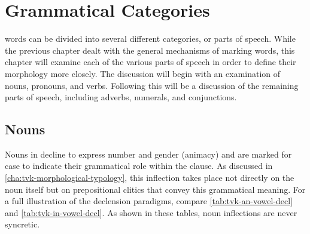 \chapter{Grammatical Categories}
\label{cha:tvk-grammatical-categories}

\langtvk{} words can be divided into several different categories, or parts of speech. While the previous chapter dealt with the general mechanisms of marking words, this chapter will examine each of the various parts of speech in order to define their morphology more closely. The discussion will begin with an examination of nouns, pronouns, and verbs. Following this will be a discussion of the remaining parts of speech, including adverbs, numerals, and conjunctions.

\section{Nouns}
\label{sec:tvk-nouns}

Nouns in \langtvk{} decline to express number and gender (animacy) and are marked for case to indicate their grammatical role within the clause. As discussed in \autoref{cha:tvk-morphological-typology}, this inflection takes place not directly on the noun itself but on prepositional clitics that convey this grammatical meaning\autocite{wals-51}. For a full illustration of the declension paradigms, compare \autoref{tab:tvk-an-vowel-decl} and \autoref{tab:tvk-in-vowel-decl}. As shown in these tables, \langtvk{} noun inflections are never syncretic\autocite{wals-28}.

